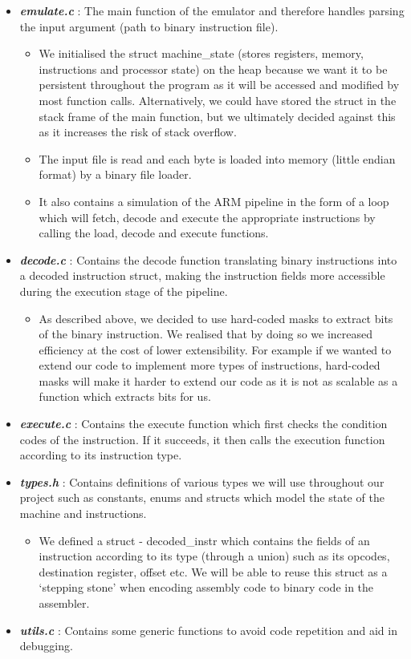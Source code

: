 \documentclass[11pt]{article}
\begin{document}
\begin{itemize}
	\item \textbf{\emph{emulate.c}} : The main function of the emulator and therefore handles parsing the input argument (path to binary instruction file). 
	\begin{itemize}
		\item We initialised the struct machine\_state (stores registers, memory, instructions and processor state) on the heap because we want it to be persistent throughout the program as it will be accessed 				  and modified by most function calls. Alternatively, we could have stored the struct in the stack frame of the main function, but we ultimately decided against this as it increases the risk of stack 			  overflow.
		\item The input file is read and each byte is loaded into memory (little endian format) by a binary file loader. 
		\item It also contains a simulation of the ARM pipeline in the form of a loop which will fetch, decode and execute the appropriate instructions by calling the load, decode and execute functions.
	\end{itemize}
	\item \textbf{\emph{decode.c}} : Contains the decode function translating binary instructions into a decoded instruction struct, making the instruction fields more accessible during the 									     execution stage of the pipeline.
	\begin{itemize}
		\item As described above, we decided to use hard-coded masks to extract bits of the binary instruction. We realised that by doing so we increased efficiency at the cost of lower extensibility. For 		          example if we wanted to extend our code to implement more types of instructions, hard-coded masks will make it harder to extend our code as it is not as scalable as a function which extracts bits 				  for us. 
	\end{itemize}
	\item \textbf{\emph{execute.c}} : Contains the execute function which first checks the condition codes of the instruction. If it succeeds, it then calls the execution function according to its 								 		  instruction type. 
	\item \textbf{\emph{types.h}} : Contains definitions of various types we will use throughout our project such as constants, enums and structs which model the state of the machine and instructions.
	\begin{itemize}
		\item We defined a struct - decoded\_instr which contains the fields of an instruction according to its type (through a union)  such as its opcodes, destination register, offset etc. We will be able 				  to reuse this struct as a ‘stepping stone’ when encoding assembly code to binary code in the assembler.
	\end{itemize}
	\item \textbf{\emph{utils.c}} : Contains some generic functions to avoid code repetition and aid in debugging.
\end{itemize}
\end{document}
